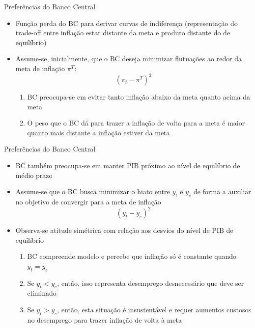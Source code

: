 \documentclass[10pt]{beamer}
\begin{document}
\begin{frame}
    {Preferências do Banco Central}
    \begin{itemize}
        \item Função perda do BC para derivar curvas de indiferença (representação do trade-off entre inflação estar distante da meta e produto distante do de equilíbrio)\bigskip
        \item Assume-se, inicialmente, que o BC deseja minimizar flutuações ao redor da meta de inflação $\pi^T$:
        \begin{equation*}
            (\pi_t - \pi^T)^2
        \end{equation*}        
        \begin{enumerate}
            \item BC preocupa-se em evitar tanto inflação abaixo da meta quanto acima da meta\medskip
            \item O peso que o BC dá para trazer a inflação de volta para a meta é maior quanto mais distante a inflação estiver da meta
        \end{enumerate}
    \end{itemize}
\end{frame}

\begin{frame}
    {Preferências do Banco Central}
    \begin{itemize}
        \item BC também preocupa-se em manter PIB próximo ao nível de equilíbrio de médio prazo\medskip
        \item Assume-se que o BC busca minimizar o hiato entre $y_t$ e $y_e$ de forma a auxiliar no objetivo de convergir para a meta de inflação
        \begin{equation*}
            \left(y_t - y_e\right)^2
        \end{equation*}
        \item Observa-se atitude simétrica com relação aos desvios do nível de PIB de equilíbrio\bigskip
        \begin{enumerate}
            \item BC compreende modelo e percebe que inflação só é constante quando $y_t = y_e$\medskip
            \item Se $y_t < y_e$, então, isso representa desemprego desnecessário que deve ser eliminado\medskip
            \item Se $y_t > y_e$, então, esta situação é insustentável e requer aumentos custosos no desemprego para trazer inflação de volta à meta
        \end{enumerate}
    \end{itemize}
\end{frame}
\end{document}
